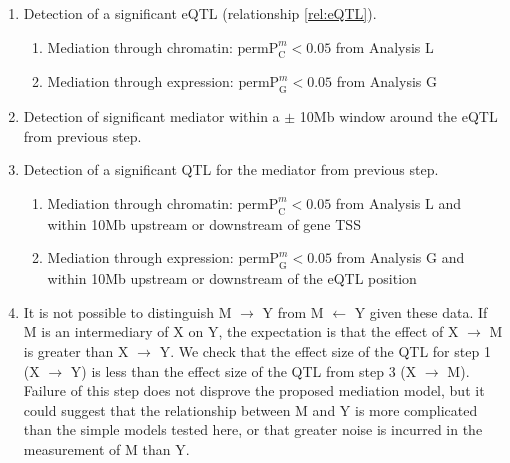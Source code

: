 \documentclass[10pt,letterpaper,twoside]{article}
\newcommand{\permpmed}{\text{permP}^{m}}
\begin{document}
\begin{enumerate}
	\item Detection of a significant eQTL (relationship \ref{rel:eQTL}).
    \begin{enumerate}
    	\item Mediation through chromatin: $\permpmed_{\text{C}} < 0.05$ from Analysis L
        \item Mediation through expression: $\permpmed_{\text{G}} < 0.05$ from Analysis G
    \end{enumerate}
    \item Detection of significant mediator within a $\pm$ 10Mb window around the eQTL from previous step.
    \item Detection of a significant QTL for the mediator from previous step.
    \begin{enumerate}
    	\item Mediation through chromatin: $\permpmed_{\text{C}} < 0.05$ from Analysis L and within 10Mb upstream or downstream of gene TSS
        \item Mediation through expression: $\permpmed_{\text{G}} < 0.05$ from Analysis G and within 10Mb upstream or downstream of the eQTL position
    \end{enumerate}
    \item It is not possible to distinguish M $\rightarrow$ Y from M $\leftarrow$ Y given these data. If M is an intermediary of X on Y, the expectation is that the effect of X $\rightarrow$ M is greater than X $\rightarrow$ Y. We check that the effect size of the QTL for step 1 (X $\rightarrow$ Y) is less than the effect size of the QTL from step 3 (X $\rightarrow$ M). Failure of this step does not disprove the proposed mediation model, but it could suggest that the relationship between M and Y is more complicated than the simple models tested here, or that greater noise is incurred in the measurement of M than Y.
\end{enumerate}

\newpage
\end{document}
